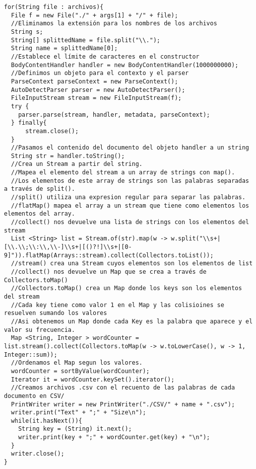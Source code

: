 \documentclass[12pt]{article}
\begin{document}
\begin{lstlisting}
for(String file : archivos){
  File f = new File("./" + args[1] + "/" + file);
  //Eliminamos la extensión para los nombres de los archivos
  String s;
  String[] splittedName = file.split("\\.");
  String name = splittedName[0];
  //Establece el límite de caracteres en el constructor
  BodyContentHandler handler = new BodyContentHandler(1000000000);
  //Definimos un objeto para el contexto y el parser
  ParseContext parseContext = new ParseContext();
  AutoDetectParser parser = new AutoDetectParser();
  FileInputStream stream = new FileInputStream(f);
  try {
    parser.parse(stream, handler, metadata, parseContext);
  } finally{
      stream.close();
  }
  //Pasamos el contenido del documento del objeto handler a un string
  String str = handler.toString();
  //Crea un Stream a partir del string.
  //Mapea el elemento del stream a un array de strings con map().
  //Los elementos de este array de strings son las palabras separadas a través de split().
  //split() utiliza una expresion regular para separar las palabras.
  //flatMap() mapea el array a un stream que tiene como elementos los elementos del array.
  //collect() nos devuelve una lista de strings con los elementos del stream
  List <String> list = Stream.of(str).map(w -> w.split("\\s+|[\\.\\;\\:\\,\\-]\\s+|[()?!]\\s+|[0-9]")).flatMap(Arrays::stream).collect(Collectors.toList());
  //stream() crea una Stream cuyos elementos son los elementos de list
  //collect() nos devuelve un Map que se crea a través de Collectors.toMap()
  //Collectors.toMap() crea un Map donde los keys son los elementos del stream
  //Cada key tiene como valor 1 en el Map y las colisioines se resuelven sumando los valores
  //Asi obtenemos un Map donde cada Key es la palabra que aparece y el valor su frecuencia.
  Map <String, Integer > wordCounter = list.stream().collect(Collectors.toMap(w -> w.toLowerCase(), w -> 1, Integer::sum));
  //Ordenamos el Map segun los valores.
  wordCounter = sortByValue(wordCounter);
  Iterator it = wordCounter.keySet().iterator();
  //Creamos archivos .csv con el recuento de las palabras de cada documento en CSV/
  PrintWriter writer = new PrintWriter("./CSV/" + name + ".csv");
  writer.print("Text" + ";" + "Size\n");
  while(it.hasNext()){
    String key = (String) it.next();
    writer.print(key + ";" + wordCounter.get(key) + "\n");
  }
  writer.close();
}
\end{lstlisting}
\end{document}
